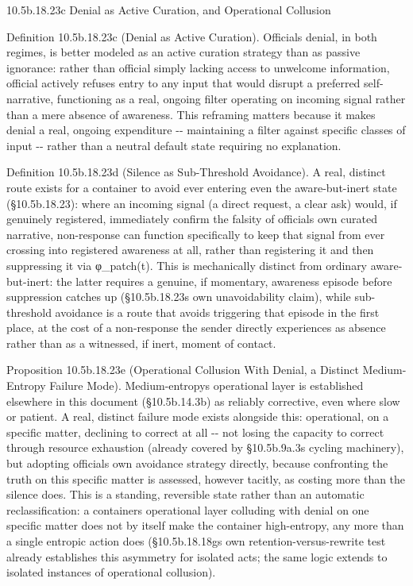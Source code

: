 \documentclass[
]{article}
\begin{document}
10.5b.18.23c Denial as Active Curation, and Operational Collusion

Definition 10.5b.18.23c (Denial as Active Curation). Officials denial,
in both regimes, is better modeled as an active curation strategy than
as passive ignorance: rather than official simply lacking access to
unwelcome information, official actively refuses entry to any input that
would disrupt a preferred self-narrative, functioning as a real, ongoing
filter operating on incoming signal rather than a mere absence of
awareness. This reframing matters because it makes denial a real,
ongoing expenditure -\/- maintaining a filter against specific classes
of input -\/- rather than a neutral default state requiring no
explanation.

Definition 10.5b.18.23d (Silence as Sub-Threshold Avoidance). A real,
distinct route exists for a container to avoid ever entering even the
aware-but-inert state (§10.5b.18.23): where an incoming signal (a direct
request, a clear ask) would, if genuinely registered, immediately
confirm the falsity of officials own curated narrative, non-response can
function specifically to keep that signal from ever crossing into
registered awareness at all, rather than registering it and then
suppressing it via φ\_patch(t). This is mechanically distinct from
ordinary aware-but-inert: the latter requires a genuine, if momentary,
awareness episode before suppression catches up (§10.5b.18.23s own
unavoidability claim), while sub-threshold avoidance is a route that
avoids triggering that episode in the first place, at the cost of a
non-response the sender directly experiences as absence rather than as a
witnessed, if inert, moment of contact.

Proposition 10.5b.18.23e (Operational Collusion With Denial, a Distinct
Medium-Entropy Failure Mode). Medium-entropys operational layer is
established elsewhere in this document (§10.5b.14.3b) as reliably
corrective, even where slow or patient. A real, distinct failure mode
exists alongside this: operational, on a specific matter, declining to
correct at all -\/- not losing the capacity to correct through resource
exhaustion (already covered by §10.5b.9a.3s cycling machinery), but
adopting officials own avoidance strategy directly, because confronting
the truth on this specific matter is assessed, however tacitly, as
costing more than the silence does. This is a standing, reversible state
rather than an automatic reclassification: a containers operational
layer colluding with denial on one specific matter does not by itself
make the container high-entropy, any more than a single entropic action
does (§10.5b.18.18gs own retention-versus-rewrite test already
establishes this asymmetry for isolated acts; the same logic extends to
isolated instances of operational collusion).
\end{document}
